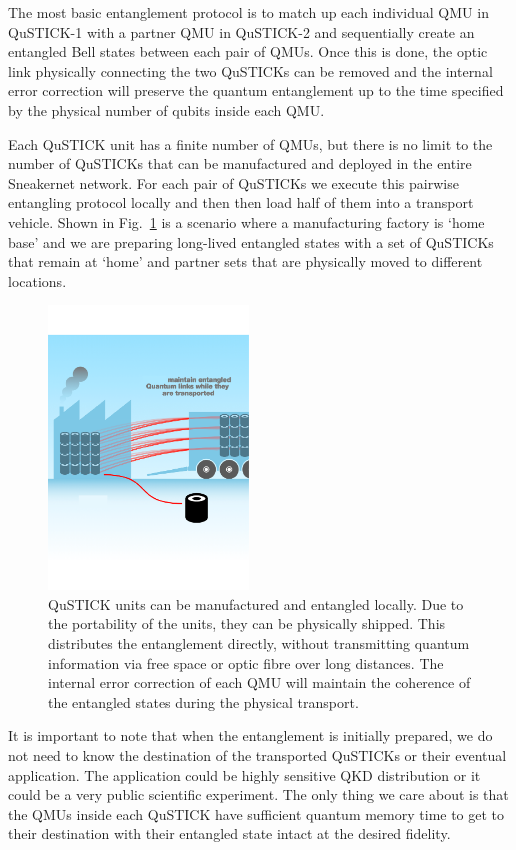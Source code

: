 \documentclass[twocolumn, aps, rmp, amsmath, amssymb, nofootinbib, superscriptaddress, longbibliography, floatfix, table-of-contents, eqsecnum]{revtex4-2}
\begin{document}
The most basic entanglement protocol is to match up each individual QMU in QuSTICK-1 with a partner QMU in QuSTICK-2 and sequentially create an entangled Bell states between each pair of QMUs. Once this is done, the optic link physically connecting the two QuSTICKs can be removed and the internal error correction will preserve the quantum entanglement up to the time specified by the physical number of qubits inside each QMU.

Each QuSTICK unit has a finite number of QMUs, but there is no limit to the number of QuSTICKs that can be manufactured and deployed in the entire Sneakernet network. For each pair of QuSTICKs we execute this pairwise entangling protocol locally and then then load half of them into a transport vehicle. Shown in Fig.~\ref{fig:loading} is a scenario where a manufacturing factory is `home base' and we are preparing long-lived entangled states with a set of QuSTICKs that remain at `home' and partner sets that are physically moved to different locations. 

\begin{figure}[htbp!]
	\includegraphics[clip=true, width=0.475\textwidth]{qustick2}
	\caption{QuSTICK units can be manufactured and entangled locally.  Due to the portability of the units, they can be physically shipped.  This distributes the entanglement directly, without transmitting quantum information via free space or optic fibre over long distances.  The internal error correction of each QMU will maintain the coherence of the entangled states during the physical transport.} \label{fig:loading}
\end{figure}

It is important to note that when the entanglement is initially prepared, we do not need to know the destination of the transported QuSTICKs or their eventual application. The application could be highly sensitive QKD distribution or it could be a very public scientific experiment. The only thing we care about is that the QMUs inside each QuSTICK have sufficient quantum memory time to get to their destination with their entangled state intact at the desired fidelity.
\end{document}

